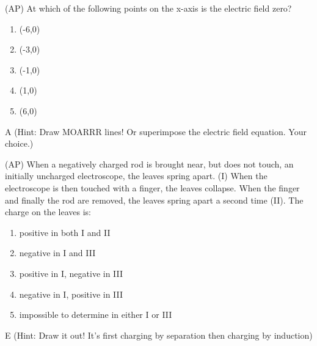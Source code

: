 
\begin{question}
(AP) At which of the following points on the x-axis is the electric field zero?
\begin{multicols}{5}
\begin{enumerate}[label=(\alph*)]
    \item (-6,0)
    \item (-3,0)
    \item (-1,0)
    \item (1,0)
    \item (6,0)
\end{enumerate}
\end{multicols}

\end{question}

\begin{solution}
A (Hint: Draw MOARRR lines! Or superimpose the electric field equation. Your choice.)
\end{solution}


\begin{question}
(AP) When a negatively charged rod is brought near, but does not touch, an initially uncharged electroscope, the leaves spring apart. (I) When the electroscope is then touched with a finger, the leaves collapse. When the finger and finally the rod are removed, the leaves spring apart a second time (II). The charge on the leaves is:
\begin{enumerate}[label=(\alph*)]
    \item positive in both I and II
    \item negative in I and III
    \item positive in I, negative in III
    \item negative in I, positive in III
    \item impossible to determine in either I or III
\end{enumerate}

\end{question}

\begin{solution}
E (Hint: Draw it out! It's first charging by separation then charging by induction)
\end{solution}

